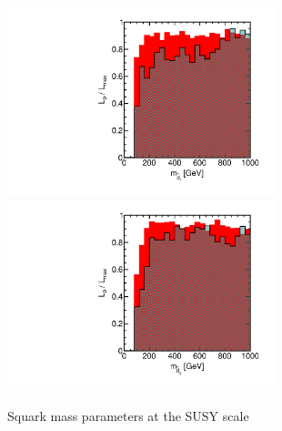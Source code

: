 \begin{figure}[htbp]
\begin{center}
\includegraphics[height=5.5cm]{figs/fig_m_d_1.pdf}
\includegraphics[height=5.5cm]{figs/fig_m_d_3.pdf}
\caption{Squark mass parameters at the SUSY scale}
\label{default}
\end{center}
\end{figure}


